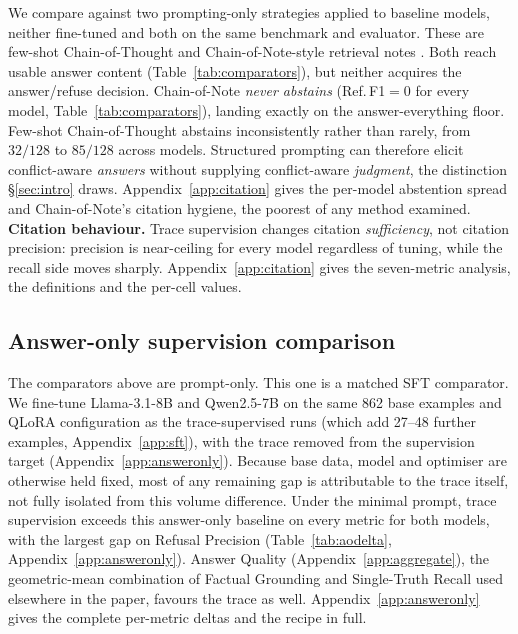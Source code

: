We compare against two prompting-only strategies applied to baseline models,
neither fine-tuned and both on the same benchmark and evaluator. These are few-shot
Chain-of-Thought \citep{wei2022cot} and Chain-of-Note-style retrieval notes
\citep{yu2024chainofnote}. Both reach usable answer content (Table~\ref{tab:comparators}), but neither
acquires the answer/refuse decision. Chain-of-Note
\emph{never abstains} (Ref.\,F1$=0$ for every model, Table~\ref{tab:comparators}),
landing exactly on the answer-everything floor. Few-shot Chain-of-Thought
abstains inconsistently rather than rarely, from $32/128$ to $85/128$ across
models. Structured prompting can therefore elicit conflict-aware \emph{answers}
without supplying conflict-aware \emph{judgment}, the distinction
\S\ref{sec:intro} draws. Appendix~\ref{app:citation} gives the per-model
abstention spread and Chain-of-Note's citation hygiene, the poorest of any
method examined. \textbf{Citation behaviour.} Trace supervision changes citation \emph{sufficiency}, not citation precision: precision is near-ceiling for every model regardless of tuning, while the recall side moves sharply. Appendix~\ref{app:citation} gives the seven-metric analysis, the definitions and the per-cell values.

\subsection{Answer-only supervision comparison}
\label{sec:answeronly}

The comparators above are prompt-only. This one is a matched SFT comparator.
We fine-tune Llama-3.1-8B and Qwen2.5-7B on the same 862 base examples and
QLoRA configuration as the trace-supervised runs (which add 27--48 further
examples, Appendix~\ref{app:sft}), with the trace removed from the
supervision target (Appendix~\ref{app:answeronly}). Because base data, model
and optimiser are otherwise held fixed, most of any remaining gap is
attributable to the trace itself, not fully isolated from this volume
difference. Under the minimal prompt, trace supervision
exceeds this answer-only baseline on every metric for both models, with the
largest gap on Refusal Precision (Table~\ref{tab:aodelta}, Appendix~\ref{app:answeronly}).
Answer Quality (Appendix~\ref{app:aggregate}), the
geometric-mean combination of Factual Grounding and Single-Truth Recall used
elsewhere in the paper, favours the trace as well.
Appendix~\ref{app:answeronly} gives the complete per-metric deltas and the recipe
in full.

